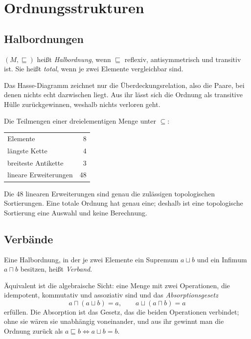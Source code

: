 \documentclass[12pt, a4paper]{article}
\begin{document}
\section{Ordnungsstrukturen}

\subsection{Halbordnungen}

\begin{definitionbox}
$(M, \sqsubseteq)$ heißt \emph{Halbordnung}, wenn $\sqsubseteq$ reflexiv,
antisymmetrisch und transitiv ist. Sie heißt \emph{total}, wenn je zwei
Elemente vergleichbar sind.
\end{definitionbox}

Das Hasse-Diagramm zeichnet nur die Überdeckungsrelation, also die Paare, bei
denen nichts echt dazwischen liegt. Aus ihr lässt sich die Ordnung als
transitive Hülle zurückgewinnen, weshalb nichts verloren geht.

\begin{examplebox}
Die Teilmengen einer dreielementigen Menge unter $\subseteq$:

\begin{center}
\begin{tabular}{lr}
\toprule
Elemente & 8\\
längste Kette & 4\\
breiteste Antikette & 3\\
lineare Erweiterungen & 48\\
\bottomrule
\end{tabular}
\end{center}

Die 48 linearen Erweiterungen sind genau die zulässigen topologischen
Sortierungen. Eine totale Ordnung hat genau eine; deshalb ist eine
topologische Sortierung eine Auswahl und keine Berechnung.
\end{examplebox}

\subsection{Verbände}

\begin{definitionbox}
Eine Halbordnung, in der je zwei Elemente ein Supremum $a \sqcup b$ und ein
Infimum $a \sqcap b$ besitzen, heißt \emph{Verband}.
\end{definitionbox}

Äquivalent ist die algebraische Sicht: eine Menge mit zwei Operationen, die
idempotent, kommutativ und assoziativ sind und das \emph{Absorptionsgesetz}
\[
  a \sqcap (a \sqcup b) = a, \qquad a \sqcup (a \sqcap b) = a
\]
erfüllen. Die Absorption ist das Gesetz, das die beiden Operationen
verbindet; ohne sie wären sie unabhängig voneinander, und aus ihr gewinnt man
die Ordnung zurück als $a \sqsubseteq b \iff a \sqcup b = b$.
\end{document}
